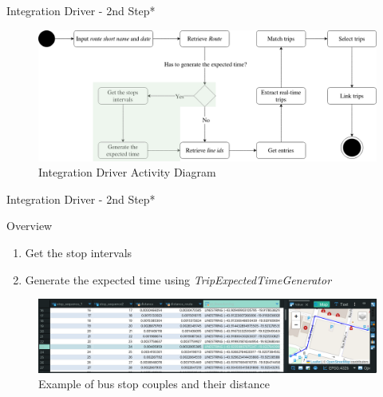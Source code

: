 \documentclass[xcolor=dvipsnames,table]{beamer}
\begin{document}
\begin{frame}{Integration Driver - 2nd Step*}
        \begin{figure}[H]
                \centering
                \includegraphics[width = \textwidth]{images/integrationDriverAD(2nd_step).png}
                \caption{Integration Driver Activity Diagram}
        \end{figure}
\end{frame}

\begin{frame}{Integration Driver - 2nd Step*}
        \begin{block}{Overview}
                \begin{enumerate}
                        \item Get the stop intervals
                        \item Generate the expected time using \textit{TripExpectedTimeGenerator}
                \end{enumerate}
        \end{block}
        \begin{figure}[H]
                \centering
                \includegraphics[width = \textwidth]{images/couplepoints.png}
                \caption{Example of bus stop couples and their distance}
        \end{figure}
\end{frame}
\end{document}
